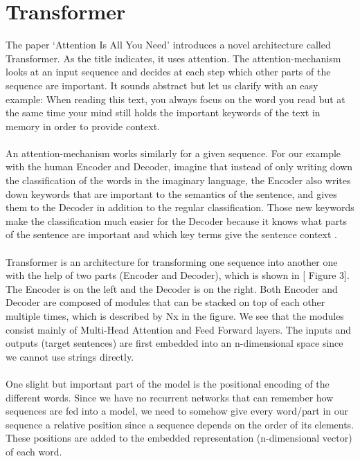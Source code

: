 \section{Transformer}
The paper ‘Attention Is All You Need’ \cite{attention}  introduces a novel architecture called Transformer. As the title indicates, it uses attention. The attention-mechanism looks at an input sequence and decides at each step which other parts of the sequence are important. It sounds abstract but let us clarify with an easy example: When reading this text, you always focus on the word you read but at the same time your mind still holds the important keywords of the text in memory in order to provide context.\\
\\
An attention-mechanism works similarly for a given sequence. For our example with the human Encoder and Decoder, imagine that instead of only writing down the classification of the words in the imaginary language, the Encoder also writes down keywords that are important to the semantics of the sentence, and gives them to the Decoder in addition to the regular classification. Those new keywords make the classification much easier for the Decoder because it knows what parts of the sentence are important and which key terms give the sentence context \cite{Transformer?}.\\
\\
Transformer is an architecture for transforming one sequence into another one with the help of two parts (Encoder and Decoder), which is shown in [ Figure 3]. The Encoder is on the left and the Decoder is on the right. Both Encoder and Decoder are composed of modules that can be stacked on top of each other multiple times, which is described by Nx in the figure. We see that the modules consist mainly of Multi-Head Attention and Feed Forward layers. The inputs and outputs (target sentences) are first embedded into an n-dimensional space since we cannot use strings directly.\\
\\
One slight but important part of the model is the positional encoding of the different words. Since we have no recurrent networks that can remember how sequences are fed into a model, we need to somehow give every word/part in our sequence a relative position since a sequence depends on the order of its elements. These positions are added to the embedded representation (n-dimensional vector) of each word.   


